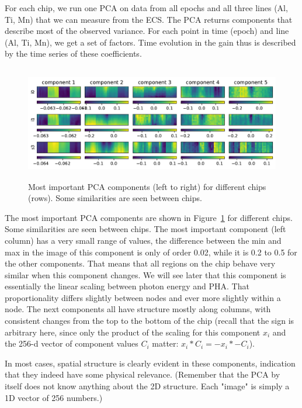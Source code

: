 \documentclass[]{spie}  %
\begin{document}
For each chip, we run one PCA on data from all epochs and all three lines (Al, Ti, Mn) that we can measure from the ECS. The PCA returns components that describe most of the observed variance. For each point in time (epoch) and line (Al, Ti, Mn), we get a set of factors. Time evolution in the gain thus is described by the time series of these coefficients.

\begin{figure} [ht]
  \begin{center}
    \includegraphics[height=5cm]{figures/components.pdf}
  \end{center}
  \caption
      {Most important PCA components (left to right) for different chips (rows). Some similarities are seen between chips. \label{fig:components}}
\end{figure}

The most important PCA components are shown in Figure~\ref{fig:components} for different chips. Some similarities are seen between chips. The most important component (left column) has a very small range of values, the difference between the min and max in the image of this component is only of order 0.02, while it is 0.2 to 0.5 for the other components. That means that all regions on the chip behave very similar when this component changes. We will see later that this component is essentially the linear scaling between photon energy and PHA. That proportionality differs slightly between nodes and ever more slightly within a node. The next components all have structure mostly along columns, with consistent changes from the top to the bottom of the chip
(recall that the sign is arbitrary here, since only the product of the scaling for this component $x_i$ and the 256-d vector of component values $C_i$ matter: $x_i * C_i = -x_i * -C_i$).

In most cases, spatial structure is clearly evident in these components, indication that they indeed have some physical relevance. (Remember that the PCA by itself does not know anything about the 2D structure. Each "image" is simply a 1D vector of 256 numbers.)
\end{document}
